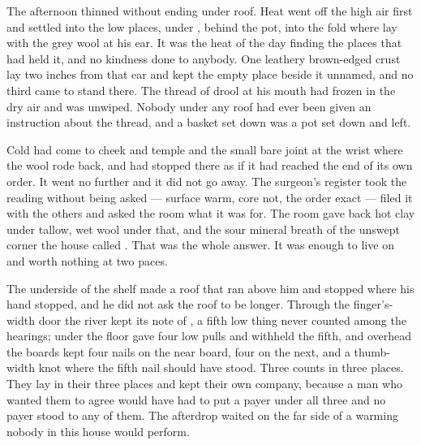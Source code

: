 The afternoon thinned without ending under  roof. Heat went off the high air first and settled into the low places, under , behind the pot, into the fold where  lay with the grey wool at his ear. It was the heat of the day finding the places that had held it, and no kindness done to anybody. One leathery brown-edged crust lay two inches from that ear and kept the empty place beside it unnamed, and no third came to stand there. The thread of drool at his mouth had frozen in the dry air and was unwiped. Nobody under any roof had ever been given an instruction about the thread, and a basket set down was a pot set down and left.

Cold had come to cheek and temple and the small bare joint at the wrist where the wool rode back, and had stopped there as if it had reached the end of its own order. It went no further and it did not go away. The surgeon's register took the reading without being asked --- surface warm, core not, the order exact --- filed it with the others and asked the room what it was for. The room gave back hot clay under tallow, wet wool under that, and the sour mineral breath of the unswept corner the house called . That was the whole answer. It was enough to live on and worth nothing at two paces.

The underside of the shelf made a roof that ran above him and stopped where his hand stopped, and he did not ask the roof to be longer. Through the finger's-width door the river kept its note of , a fifth low thing never counted among the hearings; under the floor  gave four low pulls and withheld the fifth, and overhead the boards kept four nails on the near board, four on the next, and a thumb-width knot where the fifth nail should have stood. Three counts in three places. They lay in their three places and kept their own company, because a man who wanted them to agree would have had to put a payer under all three and no payer stood to any of them. The afterdrop waited on the far side of a warming nobody in this house would perform.

\scenebreak

